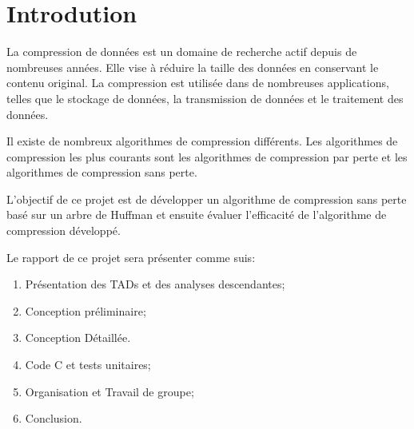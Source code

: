 \section{Introdution}
	La compression de données est un domaine de recherche actif depuis de nombreuses années. Elle vise à réduire la taille des données en conservant le contenu original. La compression est utilisée dans de nombreuses applications, telles que le stockage de données, la transmission de données et le traitement des données.

	Il existe de nombreux algorithmes de compression différents. Les algorithmes de compression les plus courants sont les algorithmes de compression par perte et les algorithmes de compression sans perte.

	L'objectif de ce projet est de développer un algorithme de compression sans perte basé sur un arbre de Huffman et ensuite évaluer l'efficacité de l'algorithme de compression développé.
	
	Le rapport de ce projet sera présenter comme suis:
 
	\begin{enumerate}
		\item Présentation des TADs et des analyses descendantes;
		\item Conception préliminaire;
		\item Conception Détaillée.
		\item Code C et tests unitaires;
		\item Organisation et Travail de groupe;
		\item Conclusion.
	\end{enumerate}
